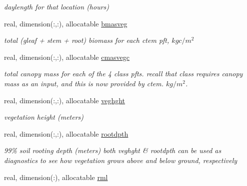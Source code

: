 \begin{DoxyCompactItemize}
\begin{DoxyCompactList}\small\item\em daylength for that location (hours) \end{DoxyCompactList}\item 
\hypertarget{structctem__statevars_1_1veg__gat_a7c2a10c4526ca44bf403eaba254d892d}{}real, dimension(\+:,\+:), allocatable \hyperlink{structctem__statevars_1_1veg__gat_a7c2a10c4526ca44bf403eaba254d892d}{bmasveg}\label{structctem__statevars_1_1veg__gat_a7c2a10c4526ca44bf403eaba254d892d}

\begin{DoxyCompactList}\small\item\em total (gleaf + stem + root) biomass for each ctem pft, $kg c/m^2$ \end{DoxyCompactList}\item 
\hypertarget{structctem__statevars_1_1veg__gat_ae45c14d17078cba9bf543985573739bc}{}real, dimension(\+:,\+:), allocatable \hyperlink{structctem__statevars_1_1veg__gat_ae45c14d17078cba9bf543985573739bc}{cmasvegc}\label{structctem__statevars_1_1veg__gat_ae45c14d17078cba9bf543985573739bc}

\begin{DoxyCompactList}\small\item\em total canopy mass for each of the 4 class pfts. recall that class requires canopy mass as an input, and this is now provided by ctem. $kg/m^2$. \end{DoxyCompactList}\item 
\hypertarget{structctem__statevars_1_1veg__gat_ab8bd8bda137701aba71a47c3e6fb9bc0}{}real, dimension(\+:,\+:), allocatable \hyperlink{structctem__statevars_1_1veg__gat_ab8bd8bda137701aba71a47c3e6fb9bc0}{veghght}\label{structctem__statevars_1_1veg__gat_ab8bd8bda137701aba71a47c3e6fb9bc0}

\begin{DoxyCompactList}\small\item\em vegetation height (meters) \end{DoxyCompactList}\item 
\hypertarget{structctem__statevars_1_1veg__gat_adc00bce954810bf5c168fa7730100b08}{}real, dimension(\+:,\+:), allocatable \hyperlink{structctem__statevars_1_1veg__gat_adc00bce954810bf5c168fa7730100b08}{rootdpth}\label{structctem__statevars_1_1veg__gat_adc00bce954810bf5c168fa7730100b08}

\begin{DoxyCompactList}\small\item\em 99\% soil rooting depth (meters) both veghght \& rootdpth can be used as diagnostics to see how vegetation grows above and below ground, respectively \end{DoxyCompactList}\item 
\hypertarget{structctem__statevars_1_1veg__gat_a02e381ae54a98e5108f982cee4769439}{}real, dimension(\+:), allocatable \hyperlink{structctem__statevars_1_1veg__gat_a02e381ae54a98e5108f982cee4769439}{rml}\label{structctem__statevars_1_1veg__gat_a02e381ae54a98e5108f982cee4769439}


\end{DoxyCompactItemize}
